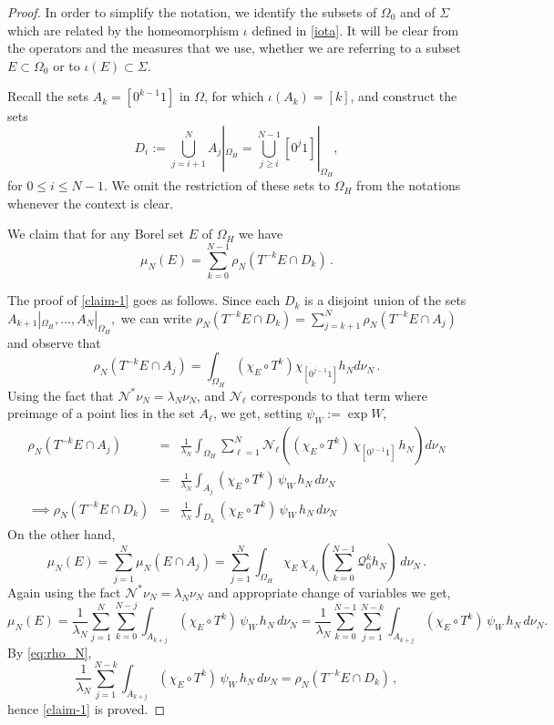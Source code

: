 \documentclass{amsart}
\theoremstyle{definition}
\theoremstyle{remark}
\theoremstyle{definition}
\numberwithin{equation}{section}
\newcommand{\CN}{{\mathcal N}}
\newcommand{\CQ}{{\mathcal Q}}
\newcommand{\CW}{{W}}
\begin{document}
\begin{proof} 
In order to simplify the notation, we identify the subsets of $\Omega_0$ and of $\Sigma$ which are related by the homeomorphism $\iota$ defined in \eqref{iota}. It will be clear from the operators and the measures that we use, whether we are referring to a subset $E\subset \Omega_0$ or to $\iota(E) \subset \Sigma$.

Recall the sets $A_{k} = [0^{k-1}1]$ in $\Omega$, for which $\iota(A_k)=[k]$, and construct the sets 
\[
D_{i} :=\bigcup\limits_{j = i+1}^{N}A_{j}|_{\Omega_{H}} = \bigcup\limits_{j \ge i}^{N-1}[0^{j}1]|_{\Omega_{H}},
\]
for $0 \le i \le N-1$. We omit the restriction of these sets to $\Omega_{H}$ from the notations whenever the context is clear.

We claim that for any Borel set $E$ of $\Omega_{H}$ we have
\begin{equation}\label{claim-1}
\mu_{N}(E) = \sum\limits_{k =0}^{N-1} \rho_{N}(T^{-k}E \cap D_{k})\, .
\end{equation}

The proof of \eqref{claim-1} goes as follows. Since each $D_{k}$ is a disjoint union of the sets $A_{k+1}|_{\Omega_{H}}, \dots, A_{N}|_{\Omega_{H}},$ we can write $\rho_{N}(T^{-k}E \cap D_{k}) = \sum_{j=k+1}^{N}\rho_{N}(T^{-k}E \cap A_{j})$ and observe that 
\[
\rho_{N}(T^{-k}E \cap A_{j}) = \int_{\Omega_{H}} (\chi_{E}\circ T^{k}) \chi_{[0^{j-1}1]}h_{N} d\nu_{N}\, .
\]
Using the fact that $\CN^{*}\nu_{N} = \lambda_{N} \nu_{N}$, and $\CN_{\ell}$ corresponds to that term where preimage of a point lies in the set $A_{\ell}$, we get, setting $\psi_\CW := \exp \CW$,
\begin{eqnarray}
    \rho_{N}(T^{-k}E \cap A_{j}) & = & \frac{1}{\lambda_{N}}\int_{\Omega_{H}} \sum\limits_{\ell=1}^{N} \CN_\ell \left((\chi_{E}\circ T^{k})\, \chi_{[0^{j-1}1]}\,h_{N}\right) d\nu_{N} \nonumber \\
    &=& \frac{1}{\lambda_{N}}\int_{A_{j}} (\chi_{E}\circ T^{k}) \, \psi_{\CW} \, h_{N} \, d\nu_{N} \nonumber \\
   \implies \rho_{N}(T^{-k}E \cap D_{k}) & = & \frac{1}{\lambda_{N}}\int_{D_{k}} (\chi_{E}\circ T^{k}) \, \psi_{\CW} \, h_{N} \, d\nu_{N} \label{eq:rho_N}
\end{eqnarray}
On the other hand, 
\[
\mu_{N}(E) = \sum\limits_{j=1}^{N}\mu_{N}(E \cap A_{j}) = \sum\limits_{j=1}^{N} \int_{\Omega_{H}} \chi_{E} \, \chi_{A_{j}} \left( \sum\limits_{k=0}^{N-1}\CQ_{0}^{k}h_{N}\right) \, d\nu_{N}\, .
\]
 Again using the fact $\CN^{*}\nu_{N} = \lambda_{N} \nu_{N}$ and appropriate change of variables we get,
    \[ 
        \mu_{N}(E) = \frac{1}{\lambda_{N}} \sum\limits_{j=1}^{N} \sum\limits_{k=0}^{N-j} \int_{A_{k+j}} (\chi_{E} \circ T^{k}) \, \psi_{\CW} \, h_{N} \, d\nu_{N} = \frac{1}{\lambda_{N}} \sum\limits_{k=0}^{N-1} \sum\limits_{j=1}^{N-k} \int_{A_{k+j}} (\chi_{E} \circ T^{k}) \, \psi_{\CW} \, h_{N} \, d\nu_{N}. 
 \]
By \eqref{eq:rho_N},
\[
\frac{1}{\lambda_{N}} \sum\limits_{j=1}^{N-k} \int_{A_{k+j}} (\chi_{E} \circ T^{k}) \, \psi_{\CW} \, h_{N} \, d\nu_{N}=\rho_{N}(T^{-k}E \cap D_{k})\, ,
\]
hence \eqref{claim-1} is proved.


\end{proof}
\end{document}

